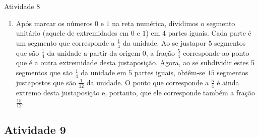 \documentclass[oneside]{book}
\begin{document}
\begin{multicols}{2}
\begin{resposta*}{Atividade 8}
\begin{enumerate} [\quad a)]
    \item       Após marcar os números       $0$       e       $1$       na reta 
numérica, dividimos o segmento unitário (aquele de extremidades em       $0$     
  e       $1$) em       $4$       partes iguais. Cada parte é um segmento que 
corresponde a       $\frac{1}{4}$       da unidade. Ao se justapor       $5$     
  segmentos que são       $\frac{1}{4}$       da unidade a partir da origem 0, a 
fração       $\frac{5}{4}$       corresponde ao ponto que é a outra extremidade 
desta justaposição. Agora, ao se subdividir estes 5 segmentos que são       
$\frac{1}{4}$       da unidade em 5 partes iguais, obtêm-se       $15$       
segmentos justapostos que são       $\frac{1}{12}$       da unidade. O ponto que 
corresponde a       $\frac{5}{4}$       é ainda extremo desta justaposição e, 
portanto, que ele corresponde também a fração       $\frac{15}{12}$.      


\noindent {}

\end{enumerate} %
  
\end{resposta*}


\subsection{Atividade 9}


\end{multicols}
\end{document}
